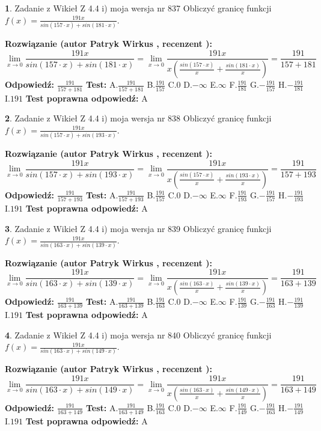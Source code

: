 \documentclass[12pt, a4paper]{article}
\theoremstyle{definition} %
\newtheorem{zad}{}
\newcommand{\zadStart}[1]{\begin{zad}#1\newline}
\newcommand{\zadStop}{\end{zad}}
\newcommand{\rozwStart}[2]{\noindent \textbf{Rozwiązanie (autor #1 , recenzent #2): }\newline}
\newcommand{\rozwStop}{\newline}
\newcommand{\odpStart}{\noindent \textbf{Odpowiedź:}\newline}
\newcommand{\odpStop}{\newline}
\newcommand{\testStart}{\noindent \textbf{Test:}\newline}
\newcommand{\testStop}{\newline}
\newcommand{\kluczStart}{\noindent \textbf{Test poprawna odpowiedź:}\newline}
\newcommand{\kluczStop}{\newline}
\begin{document}
\zadStart{Zadanie z Wikieł Z 4.4 i) moja wersja nr 837}
Obliczyć granicę funkcji $f(x)=\frac{191x}{sin(157\cdot x) +sin(181\cdot x)}$.
\zadStop
\rozwStart{Patryk Wirkus}{}
$$\lim\limits_{x\to 0}\frac{191x}{sin(157\cdot x) +sin(181\cdot x)}=\lim\limits_{x\to 0}\frac{191x}{x(\frac{sin(157\cdot x)}{x}+\frac{sin(181\cdot x)}{x})}=\frac{191}{157+181}$$
\rozwStop
\odpStart
$\frac{191}{157+181}$
\odpStop
\testStart
A.$\frac{191}{157+181}$
B.$\frac{191}{157}$
C.$0$
D.$-\infty$
E.$\infty$
F.$\frac{191}{181}$
G.$-\frac{191}{157}$
H.$-\frac{191}{181}$
I.$191$
\testStop
\kluczStart
A
\kluczStop



\zadStart{Zadanie z Wikieł Z 4.4 i) moja wersja nr 838}
Obliczyć granicę funkcji $f(x)=\frac{191x}{sin(157\cdot x) +sin(193\cdot x)}$.
\zadStop
\rozwStart{Patryk Wirkus}{}
$$\lim\limits_{x\to 0}\frac{191x}{sin(157\cdot x) +sin(193\cdot x)}=\lim\limits_{x\to 0}\frac{191x}{x(\frac{sin(157\cdot x)}{x}+\frac{sin(193\cdot x)}{x})}=\frac{191}{157+193}$$
\rozwStop
\odpStart
$\frac{191}{157+193}$
\odpStop
\testStart
A.$\frac{191}{157+193}$
B.$\frac{191}{157}$
C.$0$
D.$-\infty$
E.$\infty$
F.$\frac{191}{193}$
G.$-\frac{191}{157}$
H.$-\frac{191}{193}$
I.$191$
\testStop
\kluczStart
A
\kluczStop



\zadStart{Zadanie z Wikieł Z 4.4 i) moja wersja nr 839}
Obliczyć granicę funkcji $f(x)=\frac{191x}{sin(163\cdot x) +sin(139\cdot x)}$.
\zadStop
\rozwStart{Patryk Wirkus}{}
$$\lim\limits_{x\to 0}\frac{191x}{sin(163\cdot x) +sin(139\cdot x)}=\lim\limits_{x\to 0}\frac{191x}{x(\frac{sin(163\cdot x)}{x}+\frac{sin(139\cdot x)}{x})}=\frac{191}{163+139}$$
\rozwStop
\odpStart
$\frac{191}{163+139}$
\odpStop
\testStart
A.$\frac{191}{163+139}$
B.$\frac{191}{163}$
C.$0$
D.$-\infty$
E.$\infty$
F.$\frac{191}{139}$
G.$-\frac{191}{163}$
H.$-\frac{191}{139}$
I.$191$
\testStop
\kluczStart
A
\kluczStop



\zadStart{Zadanie z Wikieł Z 4.4 i) moja wersja nr 840}
Obliczyć granicę funkcji $f(x)=\frac{191x}{sin(163\cdot x) +sin(149\cdot x)}$.
\zadStop
\rozwStart{Patryk Wirkus}{}
$$\lim\limits_{x\to 0}\frac{191x}{sin(163\cdot x) +sin(149\cdot x)}=\lim\limits_{x\to 0}\frac{191x}{x(\frac{sin(163\cdot x)}{x}+\frac{sin(149\cdot x)}{x})}=\frac{191}{163+149}$$
\rozwStop
\odpStart
$\frac{191}{163+149}$
\odpStop
\testStart
A.$\frac{191}{163+149}$
B.$\frac{191}{163}$
C.$0$
D.$-\infty$
E.$\infty$
F.$\frac{191}{149}$
G.$-\frac{191}{163}$
H.$-\frac{191}{149}$
I.$191$
\testStop
\kluczStart
A
\kluczStop
\end{document}
